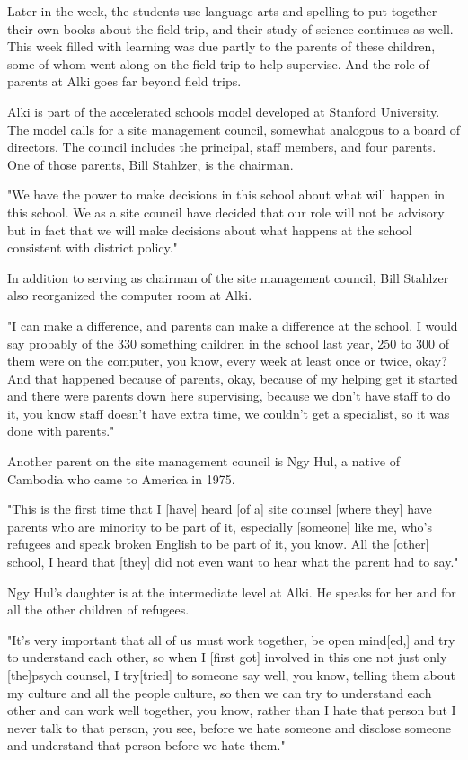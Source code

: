 Later in the week, the students use language arts and spelling to put together their own books about the field trip, and their study of science continues as well. This week filled with learning was due partly to the parents of these children, some of whom went along on the field trip to help supervise. And the role of parents at Alki goes far beyond field trips.

Alki is part of the accelerated schools model developed at Stanford University. The model calls for a site management council, somewhat analogous to a board of directors. The council includes the principal, staff members, and four parents. One of those parents, Bill Stahlzer, is the chairman.

"We have the power to make decisions in this school about what will happen in this school. We as a site council have decided that our role will not be advisory but in fact that we will make decisions about what happens at the school consistent with district policy."

In addition to serving as chairman of the site management council, Bill Stahlzer also reorganized the computer room at Alki.

"I can make a difference, and parents can make a difference at the school. I would say probably of the 330 something children in the school last year, 250 to 300 of them were on the computer, you know, every week at least once or twice, okay? And that happened because of parents, okay, because of my helping get it started and there were parents down here supervising, because we don't have staff to do it, you know staff doesn't have extra time, we couldn't get a specialist, so it was done with parents."

Another parent on the site management council is Ngy Hul, a native of Cambodia who came to America in 1975.

"This is the first time that I [have] heard [of a] site counsel [where they] have parents who are minority to be part of it, especially [someone] like me, who's refugees and speak broken English to be part of it, you know. All the [other] school, I heard that [they] did not even want to hear what the parent had to say."

Ngy Hul's daughter is at the intermediate level at Alki. He speaks for her and for all the other children of refugees.

"It's very important that all of us must work together, be open mind[ed,] and try to understand each other, so when I [first got] involved in this one not just only [the]psych counsel, I try[tried] to someone say well, you know, telling them about my culture and all the people culture, so then we can try to understand each other and can work well together, you know, rather than I hate that person but I never talk to that person, you see, before we hate someone and disclose someone and understand that person before we hate them."

